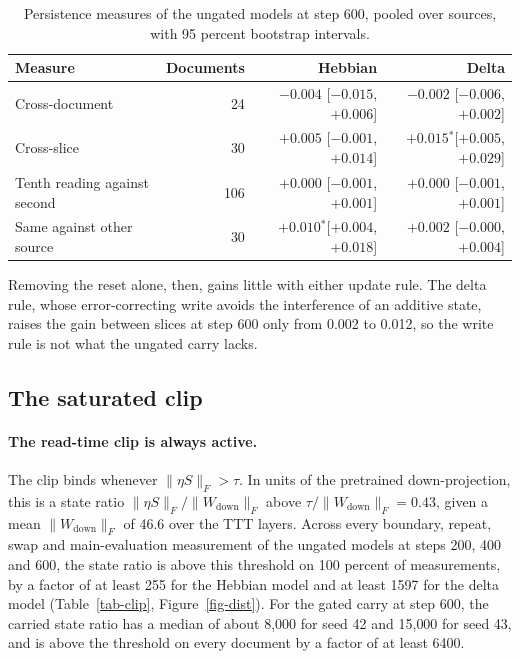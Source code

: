 \documentclass[12pt,a4paper]{report}
\newcommand{\sig}{$^{*}$}
\begin{document}
\begin{table}[H]
  \centering
  \caption{Persistence measures of the ungated models at step 600, pooled over sources, with 95 percent bootstrap intervals.}
  \label{tab-persist}
  \small
  \begin{tabular}{lrrr}
    \toprule
    Measure & Documents & Hebbian & Delta \\
    \midrule
    Cross-document & 24 & $-0.004$ {\footnotesize [$-0.015$, $+0.006$]} & $-0.002$ {\footnotesize [$-0.006$, $+0.002$]} \\
    Cross-slice & 30 & $+0.005$ {\footnotesize [$-0.001$, $+0.014$]} & $+0.015$\sig {\footnotesize [$+0.005$, $+0.029$]} \\
    Tenth reading against second & 106 & $+0.000$ {\footnotesize [$-0.001$, $+0.001$]} & $+0.000$ {\footnotesize [$-0.001$, $+0.001$]} \\
    Same against other source & 30 & $+0.010$\sig {\footnotesize [$+0.004$, $+0.018$]} & $+0.002$ {\footnotesize [$-0.000$, $+0.004$]} \\
    \bottomrule
  \end{tabular}
\end{table}

Removing the reset alone, then, gains little with either update rule. The delta rule, whose error-correcting write avoids the interference of an additive state, raises the gain between slices at step 600 only from 0.002 to 0.012, so the write rule is not what the ungated carry lacks.

\subsection{The saturated clip}
\label{ch-why}

\paragraph{The read-time clip is always active.} The clip binds whenever $\lVert \eta S \rVert_F > \tau$. In units of the pretrained down-projection, this is a state ratio $\lVert \eta S \rVert_F / \lVert W_{\mathrm{down}} \rVert_F$ above $\tau / \lVert W_{\mathrm{down}} \rVert_F = 0.43$, given a mean $\lVert W_{\mathrm{down}} \rVert_F$ of 46.6 over the TTT layers. Across every boundary, repeat, swap and main-evaluation measurement of the ungated models at steps 200, 400 and 600, the state ratio is above this threshold on 100 percent of measurements, by a factor of at least 255 for the Hebbian model and at least 1597 for the delta model (Table~\ref{tab-clip}, Figure~\ref{fig-dist}). For the gated carry at step 600, the carried state ratio has a median of about 8{,}000 for seed 42 and 15{,}000 for seed 43, and is above the threshold on every document by a factor of at least 6400.
\end{document}
